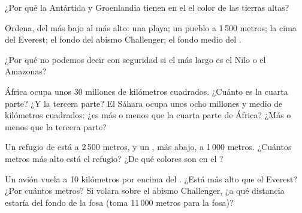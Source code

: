 \begin{exercise}[$\star$]\label{exo:g4:world-physical-map:6}
¿Por qué la Antártida y Groenlandia tienen en el  el color de
las tierras altas?
\end{exercise}

\begin{exercise}[$\star\star$]\label{exo:g4:world-physical-map:7}
Ordena, del más bajo al más alto: una playa; un pueblo a 1\,500 metros; la
cima del Everest; el fondo del abismo Challenger; el fondo medio del
.
\end{exercise}

\begin{exercise}[$\star\star$]\label{exo:g4:world-physical-map:8}
¿Por qué no podemos decir con seguridad si el  más largo es el Nilo o el
Amazonas?
\end{exercise}

\begin{exercise}[$\star\star$]\label{exo:g4:world-physical-map:9}
África ocupa unos 30 millones de kilómetros cuadrados. ¿Cuánto es la cuarta
parte? ¿Y la tercera parte? El Sáhara ocupa unos ocho millones y medio de
kilómetros cuadrados: ¿es más o menos que la cuarta parte de África? ¿Más o
menos que la tercera parte?
\end{exercise}

\begin{exercise}[$\star\star$]\label{exo:g4:world-physical-map:10}
Un refugio de  está a 2\,500 metros, y un , más abajo, a
1\,000 metros. ¿Cuántos metros más alto está el refugio? ¿De qué colores
son en el ?
\end{exercise}

\begin{exercise}[$\star\star\star$]\label{exo:g4:world-physical-map:11}
Un avión vuela a 10 kilómetros por encima del . ¿Está más alto
que el Everest? ¿Por cuántos metros? Si volara sobre el abismo Challenger,
¿a qué distancia estaría del fondo de la fosa (toma 11\,000 metros para la
fosa)?
\end{exercise}
